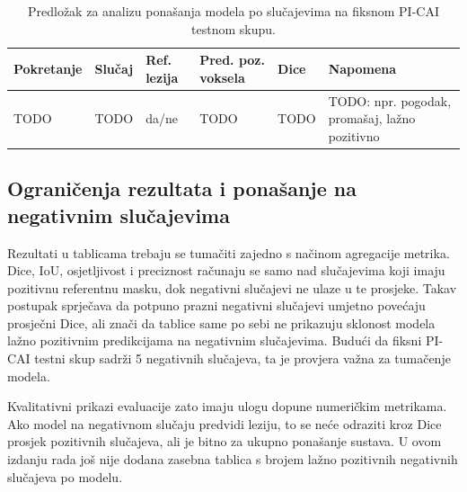 \documentclass[a4paper,12pt,oneside]{article}
\begin{document}
\begin{table}[H]
\centering
\scriptsize
\caption{Predložak za analizu ponašanja modela po slučajevima na fiksnom PI-CAI testnom skupu. \label{tab:per_case_placeholder}}
\setlength{\tabcolsep}{2pt}
\begin{tabular}{>{\raggedright\arraybackslash}p{}
                >{\raggedright\arraybackslash}p{}
                >{\centering\arraybackslash}p{}
                >{\centering\arraybackslash}p{}
                >{\centering\arraybackslash}p{}
                >{\raggedright\arraybackslash}p{}}
\toprule
Pokretanje & Slučaj & Ref. lezija & Pred. poz. voksela & Dice & Napomena \\
\midrule
TODO & TODO & da/ne & TODO & TODO & TODO: npr. pogodak, promašaj, lažno pozitivno \\
\bottomrule
\end{tabular}
\normalsize
\end{table}


\subsection{Ograničenja rezultata i ponašanje na negativnim slučajevima}

Rezultati u tablicama trebaju se tumačiti zajedno s načinom agregacije metrika. Dice, IoU, osjetljivost i preciznost računaju se samo nad slučajevima koji imaju pozitivnu referentnu masku, dok negativni slučajevi ne ulaze u te prosjeke. Takav postupak sprječava da potpuno prazni negativni slučajevi umjetno povećaju prosječni Dice, ali znači da tablice same po sebi ne prikazuju sklonost modela lažno pozitivnim predikcijama na negativnim slučajevima. Budući da fiksni PI-CAI testni skup sadrži 5 negativnih slučajeva, ta je provjera važna za tumačenje modela.

Kvalitativni prikazi evaluacije zato imaju ulogu dopune numeričkim metrikama. Ako model na negativnom slučaju predvidi leziju, to se neće odraziti kroz Dice prosjek pozitivnih slučajeva, ali je bitno za ukupno ponašanje sustava. U ovom izdanju rada još nije dodana zasebna tablica s brojem lažno pozitivnih negativnih slučajeva po modelu.
\end{document}
